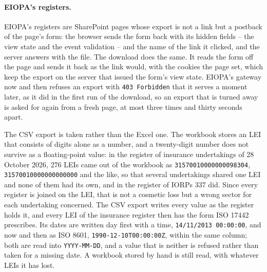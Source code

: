 \paragraph{EIOPA's registers.} EIOPA's registers are SharePoint pages whose export is not a link but a postback of the page's form: the browser sends the form back with its hidden fields -- the view state and the event validation -- and the name of the link it clicked, and the server answers with the file. The download does the same. It reads the form off the page and sends it back as the link would, with the cookies the page set, which keep the export on the server that issued the form's view state. EIOPA's gateway now and then refuses an export with \verb|403 Forbidden| that it serves a moment later, as it did in the first run of the download, so an export that is turned away is asked for again from a fresh page, at most three times and thirty seconds apart.

The CSV export is taken rather than the Excel one. The workbook stores an LEI that consists of digits alone as a number, and a twenty-digit number does not survive as a floating-point value: in the register of insurance undertakings of 28 October 2026, 276 LEIs came out of the workbook as \verb|31570010000000098304|, \verb|31570010000000000000| and the like, so that several undertakings shared one LEI and none of them had its own, and in the register of IORPs 337 did. Since every register is joined on the LEI, that is not a cosmetic loss but a wrong sector for each undertaking concerned. The CSV export writes every value as the register holds it, and every LEI of the insurance register then has the form ISO 17442 prescribes. Its dates are written day first with a time, \verb|14/11/2013 00:00:00|, and now and then as ISO 8601, \verb|1990-12-10T00:00:00Z|, within the same column; both are read into \verb|YYYY-MM-DD|, and a value that is neither is refused rather than taken for a missing date. A workbook stored by hand is still read, with whatever LEIs it has lost.

